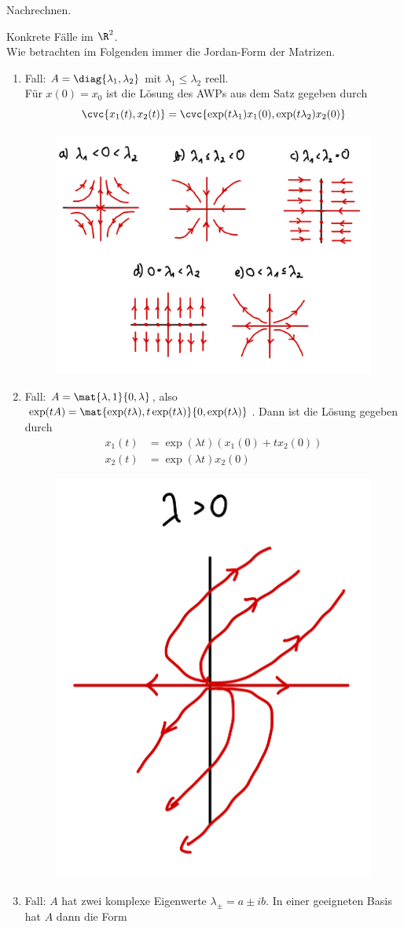 \begin{beweis}
Nachrechnen.
\end{beweis}
\begin{bemerkung}
Konkrete Fälle im $\R^2$.\\
Wie betrachten im Folgenden immer die Jordan-Form der Matrizen.
\begin{enumerate}
\item Fall: $A=\diag \{\lambda_1, \lambda_2 \}$ mit $\lambda_1 \leq \lambda_2$ reell.\\
Für $x(0)=x_0$ ist die Lösung des AWPs aus dem Satz gegeben durch 
\begin{equation}
\cvc{x_1(t), x_2(t)} = \cvc{\exp(t\lambda_1)x_1(0), \exp(t \lambda_2)x_2(0)}
\end{equation}
\begin{figure}[H]
\label{fig:fall1}
\centering
\includegraphics[width=0.5\linewidth]{Bilder/fall1.png}
\end{figure}
\item Fall: $A= \mat{\lambda, 1}{0, \lambda}$, also $\exp(tA) = \mat{\exp(t\lambda), t\exp(t \lambda)}{0, \exp(t\lambda)}$. Dann ist die Lösung gegeben durch
\begin{align}
x_1(t) &= \exp(\lambda t)(x_1(0)+tx_2(0))\\
x_2(t) &= \exp(\lambda t)x_2(0)
\end{align}
\begin{figure}[H]
\label{fig:fall2}
\centering
\includegraphics[width=0.2\linewidth]{Bilder/fall2.png}
\end{figure}
\item Fall: $A$ hat zwei komplexe Eigenwerte $\lambda_\pm = a \pm ib$. In einer geeigneten Basis hat $A$ dann die Form

\end{enumerate}
\end{bemerkung}

